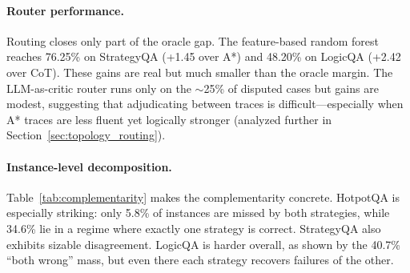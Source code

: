 \documentclass[11pt]{article}
\begin{document}
\paragraph{Router performance.}
Routing closes only part of the oracle gap. The feature-based random forest reaches 76.25\% on StrategyQA (+1.45 over A*) and 48.20\% on LogicQA (+2.42 over CoT). These gains are real but much smaller than the oracle margin. The LLM-as-critic router runs only on the $\sim$25\% of disputed cases but gains are modest, suggesting that adjudicating between traces is difficult---especially when A* traces are less fluent yet logically stronger (analyzed further in Section~\ref{sec:topology_routing}).

\begin{table}[h]
\centering
\small
{}
\caption{Instance-level complementarity decomposition. ``CoT only'' means CoT is correct and A* is wrong; ``A* only'' means the reverse. \textcolor{reviewerblue}{[R2-W1] Corrected: marginal accuracies now exactly reproduce Table~\ref{tab:main}, i.e., $\mathrm{Acc_{CoT}} = N_\mathrm{both} + N_\mathrm{CoT\text{-}only}$ and $\mathrm{Acc_{A^*}} = N_\mathrm{both} + N_\mathrm{A^*\text{-}only}$.}}
\label{tab:complementarity}
\end{table}

\paragraph{Instance-level decomposition.}
Table~\ref{tab:complementarity} makes the complementarity concrete. HotpotQA is especially striking: only 5.8\% of instances are missed by both strategies, while 34.6\% lie in a regime where exactly one strategy is correct. StrategyQA also exhibits sizable disagreement. LogicQA is harder overall, as shown by the 40.7\% ``both wrong'' mass, but even there each strategy recovers failures of the other.
\end{document}
